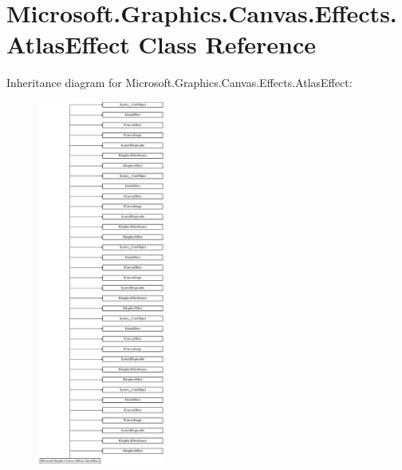 \hypertarget{class_microsoft_1_1_graphics_1_1_canvas_1_1_effects_1_1_atlas_effect}{}\section{Microsoft.\+Graphics.\+Canvas.\+Effects.\+Atlas\+Effect Class Reference}
\label{class_microsoft_1_1_graphics_1_1_canvas_1_1_effects_1_1_atlas_effect}
Inheritance diagram for Microsoft.\+Graphics.\+Canvas.\+Effects.\+Atlas\+Effect\+:\begin{figure}[H]
\begin{center}
\leavevmode
\includegraphics[height=12.000000cm]{class_microsoft_1_1_graphics_1_1_canvas_1_1_effects_1_1_atlas_effect}
\end{center}
\end{figure}
